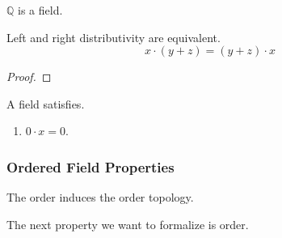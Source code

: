 \documentclass{article}
\begin{document}
      \begin{theorem}
        $\mathbb{Q}$ is a field. 
      \end{theorem}

      \begin{lemma}[Left = Right Distributivity]
        Left and right distributivity are equivalent. 
        \begin{equation}
          x \cdot (y + z) = (y + z) \cdot x
        \end{equation}
      \end{lemma} 
      \begin{proof}
        
      \end{proof} 

      \begin{lemma}[Operations]
        A field satisfies. 
        \begin{enumerate}
          \item $0 \cdot x = 0$.  
        \end{enumerate}
      \end{lemma}

    \subsubsection{Ordered Field Properties} 

      The order induces the order topology. 

      The next property we want to formalize is order. 
\end{document}
